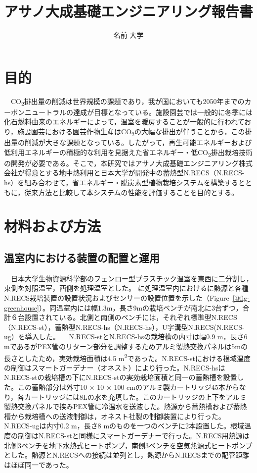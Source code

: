 \documentclass[
  japanese,
  11pt,
  letterpaper,
  DIV=11,
  numbers=noendperiod]{scrartcl}
\title{アサノ大成基礎エンジニアリング報告書}
\author{名前 大学}
\date{}
\newcommand{\figrefJP}[1]{\mbox{（Figure~\ref{#1}）}}
\begin{document}
\maketitle


\newpage

\section{目的}\label{ux76eeux7684}

　CO\textsubscript{2}排出量の削減は世界規模の課題であり，我が国においても2050年までのカーボンニュートラルの達成が目標となっている。施設園芸では一般的に冬季には化石燃料由来のエネルギーによって，温室を暖房することが一般的に行われており，施設園芸における園芸作物生産はCO\textsubscript{2}の大幅な排出が伴うことから，この排出量の削減が大きな課題となっている。したがって，再生可能エネルギーおよび低利用エネルギーの積極的な利用を見据えた省エネルギー・低CO\textsubscript{2}排出栽培技術の開発が必要である。そこで，本研究ではアサノ大成基礎エンジニアリング株式会社が得意とする地中熱利用と日本大学が開発中の蓄熱型N.RECS（N.RECS-hs）を組み合わせて，省エネルギー・脱炭素型植物栽培システムを構築するとともに，従来方法と比較して本システムの性能を評価することを目的とする。

\section{材料および方法}\label{ux6750ux6599ux304aux3088ux3073ux65b9ux6cd5}

\subsection{温室内における装置の配置と運用}\label{ux6e29ux5ba4ux5185ux306bux304aux3051ux308bux88c5ux7f6eux306eux914dux7f6eux3068ux904bux7528}

　日本大学生物資源科学部のフェンロー型プラスチック温室を東西に二分割し，東側を対照温室，西側を処理温室とした。
に処理温室内におけるに熱源と各種N.RECS栽培装置の設置状況およびセンサーの設置位置を示した\figrefJP{@fig-greenhouse}。同温室内には幅1.3m，長さ9mの栽培ベンチが南北に3台ずつ，合計６台設置されている。北側と南側のベンチには，それぞれ標準型N.RECS（N.RECS-st），蓄熱型N.RECS-hs（N.RECS-hs），U字溝型N.RECS(N.RECS-ug）を導入した。
　N.RECS-stとN.RECS-hsの栽培槽の内寸は幅0.9 m，長さ6
mであるがPEX管のリターン部分を調整するためアルミ製熱交換パネルは5mの長さとしたため，実効栽培面積は4.5
m\textsuperscript{2}であった。N.RECS-stにおける根域温度の制御はスマートガーデナー（オネスト）により行った。N.RECS-hsはN.RECS-stの栽培槽の下にN.RECS-stの実効栽培面積と同一の蓄熱槽を設置した。この蓄熱部分は外寸10
× 10 × 100
cmのアルミ製カートリッジ45本からなり，各カートリッジには8Lの水を充填した。このカートリッジの上下をアルミ製熱交換パネルで挟みPEX管に冷温水を送液した。熱源から蓄熱槽および蓄熱槽から栽培槽への送液制御は，オネスト社製の制御装置により行った。N.RECS-ugは内寸0.2
m，長さ8
mのものを一つのベンチに2本設置した。根域温度の制御はN.RECS-stと同様にスマートガーデナーで行った。N.RECS用熱源は北側3ベンチを地下水熱式ヒートポンプ，南側3ベンチを空気熱源式ヒートポンプとした。熱源とN.RECSへの接続は並列とし，熱源からN.RECSまでの配管距離はほぼ同一であった。
\end{document}
